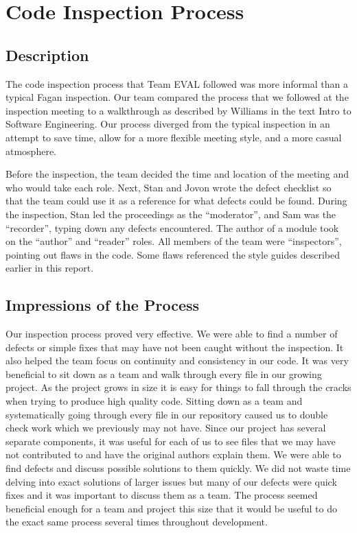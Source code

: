 \documentclass{article}
\begin{document}
\section{Code Inspection Process}

\subsection{Description}

The code inspection process that Team EVAL followed was more informal than a typical Fagan inspection. Our team compared the process that we followed at the inspection meeting to a walkthrough as described by Williams in the text Intro to Software Engineering. Our process diverged from the typical inspection in an attempt to save time, allow for a more flexible meeting style, and a more casual atmosphere.

Before the inspection, the team decided the time and location of the meeting and who would take each role. Next, Stan and Jovon wrote the defect checklist so that the team could use it as a reference for what defects could be found. During the inspection, Stan led the proceedings as the ``moderator'', and Sam was the ``recorder'', typing down any defects encountered. The author of a module took on the ``author'' and ``reader'' roles. All members of the team were ``inspectors'', pointing out flaws in the code. Some flaws referenced the style guides described earlier in this report.

\subsection{Impressions of the Process}
Our inspection process proved very effective. We were able to find a number of defects or simple fixes that may have not been caught without the inspection. It also helped the team focus on continuity and consistency in our code. It was very beneficial to sit down as a team and walk through every file in our growing project.  As the project grows in size it is easy for things to fall through the cracks when trying to produce high quality code.  Sitting down as a team and systematically going through every file in our repository caused us to double check work which we previously may not have.  Since our project has several separate components, it was useful for each of us to see files that we may have not contributed to and have the original authors explain them.
	We were able to find defects and discuss possible solutions to them quickly. We did not waste time delving into exact solutions of larger issues but many of our defects were quick fixes and it was important to discuss them as a team. The process seemed beneficial enough for a team and project this size that it would be useful to do the exact same process several times throughout development.
\end{document}
